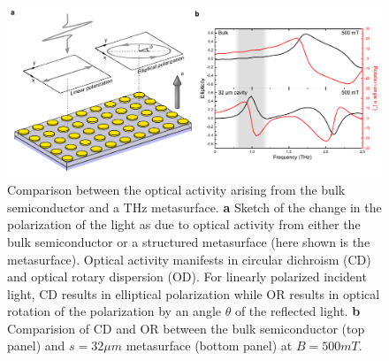 \documentclass[twocolumn]{article}
\begin{document}
\newpage

\begin{figure}[ht]
	\centering %
	\includegraphics[width=\textwidth]{Figure_5.pdf}
	\caption{Comparison between the optical activity arising from the bulk semiconductor and a THz metasurface. \textbf{a} Sketch of the change in the polarization of the light as due to optical activity from either the bulk semiconductor or a structured metasurface (here shown is the metasurface). Optical activity manifests in circular dichroism (CD) and optical rotary dispersion (OD). For linearly polarized incident light, CD results in elliptical polarization while OR results in optical rotation of the polarization by an angle $\theta$ of the reflected light. \textbf{b} Comparision of CD and OR between the bulk semiconductor (top panel) and $s=32 \mu m$ metasurface (bottom panel) at $B=500 mT$. }
	\label{fig:5}
\end{figure}
\clearpage



\end{document}
